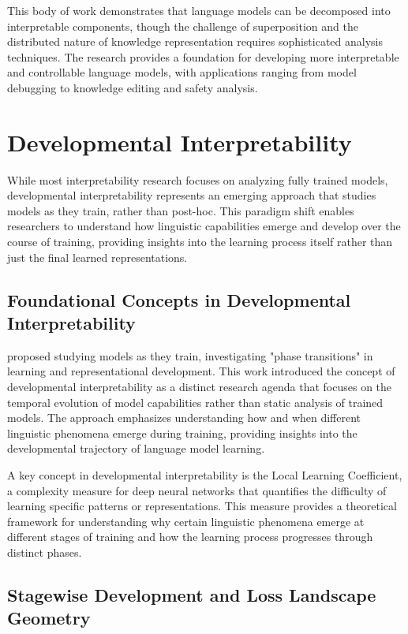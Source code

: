 This body of work demonstrates that language models can be decomposed into interpretable components, though the challenge of superposition and the distributed nature of knowledge representation requires sophisticated analysis techniques. The research provides a foundation for developing more interpretable and controllable language models, with applications ranging from model debugging to knowledge editing and safety analysis.

\section{Developmental Interpretability}

While most interpretability research focuses on analyzing fully trained models, developmental interpretability represents an emerging approach that studies models as they train, rather than post-hoc. This paradigm shift enables researchers to understand how linguistic capabilities emerge and develop over the course of training, providing insights into the learning process itself rather than just the final learned representations.

\subsection{Foundational Concepts in Developmental Interpretability}

\citet{hoogland2023towards} proposed studying models as they train, investigating "phase transitions" in learning and representational development. This work introduced the concept of developmental interpretability as a distinct research agenda that focuses on the temporal evolution of model capabilities rather than static analysis of trained models. The approach emphasizes understanding how and when different linguistic phenomena emerge during training, providing insights into the developmental trajectory of language model learning.

A key concept in developmental interpretability is the Local Learning Coefficient, a complexity measure for deep neural networks that quantifies the difficulty of learning specific patterns or representations. This measure provides a theoretical framework for understanding why certain linguistic phenomena emerge at different stages of training and how the learning process progresses through distinct phases.

\subsection{Stagewise Development and Loss Landscape Geometry}

